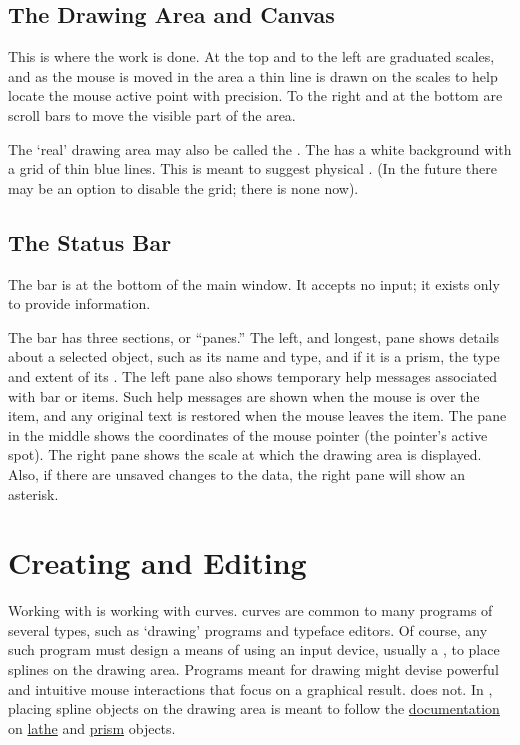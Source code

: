 		\subsection{The Drawing Area and Canvas}%
		\label{ssec:drawing_area}
		This is where the work is done. At the top and
		to the left are graduated scales, and as the mouse
		is moved in the  area a thin line
		is drawn on the scales to help locate the mouse active
		point with precision. To the right and at the bottom
		are scroll bars to move the visible part of the
		 area.
		
		The `real' drawing area may also be called the
		.
		The  has a white background with a grid
		of thin blue lines. This is meant to suggest physical
		. (In the future there
		may be an option to disable the grid; there is none now).


		\subsection{The Status Bar}%
		\label{ssec:status_bar}
		The  bar is at the bottom of
		the main window. It accepts no input; it exists
		only to provide information.
		
		The 
		bar has three sections, or ``panes.'' The left, and
		longest, pane shows details about a selected object,
		such as its name and type, and if it is a prism, the
		type and extent of its . The left
		pane also shows temporary help messages associated
		with  bar or  items. Such help
		messages are shown when the mouse is over the item, and
		any original text is restored when the mouse leaves the item.
		The pane in the middle shows the coordinates of the
		mouse pointer (the pointer's active spot). The right
		pane shows the scale at which the drawing area is displayed.
		Also, if there are unsaved changes to the data, the
		right pane will show an asterisk.


	\section{Creating and Editing}%
	\label{sec:creat_editing}
	Working with \IXpkg{} is working with  curves.
	 curves are common to many programs of
	several types, such as `drawing' programs and typeface
	editors. Of course, any such program must design a
	means of using an input device, usually a ,
	to place splines on the drawing area. Programs meant
	for drawing might devise powerful and intuitive mouse
	interactions that focus on a graphical result.
	\IXpkgu{} does not. In \IXpkg{}, placing spline
	objects on the drawing area is meant to follow the
	\IXpov{} \href{\URLPOVdocs}{documentation}
	on
	\href{\URLPOVdocsLathe}{lathe}
	and
	\href{\URLPOVdocsPrism}{prism}
	objects.

